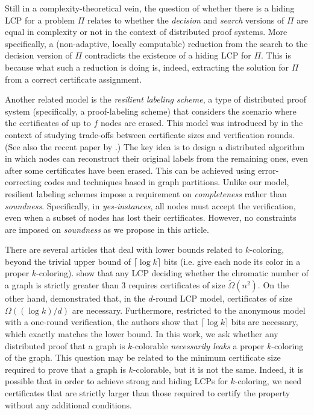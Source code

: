 \documentclass[11pt]{article}
\begin{document}
Still in a complexity-theoretical vein, the question of whether there is a
hiding LCP for a problem $\Pi$ relates to whether the \emph{decision} and
\emph{search} versions of $\Pi$ are equal in complexity or not in the context of
distributed proof systems.
More specifically, a (non-adaptive, locally computable) reduction from the
search to the decision version of $\Pi$ contradicts the existence of a hiding
LCP for $\Pi$.
This is because what such a reduction is doing is, indeed, extracting the
solution for $\Pi$ from a correct certificate assignment.



Another related model is the \emph{resilient labeling scheme}, a type of
distributed proof system (specifically, a proof-labeling scheme) that considers
the scenario where the certificates of up to \( f \) nodes are erased. This
model was introduced by \textcite{fischer2022explicit} in the context of
studying trade-offs between certificate sizes and verification rounds. 
(See also the recent paper by \textcite{censor2025near}.) 
The key idea is to design a distributed algorithm in which nodes can reconstruct
their original labels from the remaining ones, even after some certificates have
been erased. 
This can be achieved using error-correcting codes and  techniques based in graph
partitions.
Unlike our model, resilient labeling schemes impose a requirement on
\emph{completeness} rather than \emph{soundness}. Specifically, in
\emph{yes-instances}, all nodes must accept the verification, even when a subset
of nodes has lost their certificates. However, no constraints are imposed on 
\emph{soundness} as we propose in this article. 

There are several articles that deal with lower bounds related to $k$-coloring, beyond the trivial upper bound of $\lceil \log k \rceil$ bits (i.e. give each node its color in a proper $k$-coloring). \Textcite{goos2016locally} show that any LCP deciding whether the chromatic number of a graph is strictly greater than $3$ requires certificates of size $\tilde{\Omega}(n^2)$. On the other hand, \textcite{bousquet24_local_stacs} demonstrated that, in the $d$-round LCP model, certificates of size $\Omega((\log k)/d)$ are necessary. Furthermore,  restricted to the anonymous model with a one-round verification, the authors show that $\lceil \log k \rceil$ bits are necessary, which exactly matches the lower bound. 
In this work, we ask whether any distributed proof that a graph is $k$-colorable \emph{necessarily leaks} a proper $k$-coloring of the graph. This question may be related to the minimum certificate size required to prove that a graph is $k$-colorable, but it is not the same. Indeed, it is possible that in order to achieve strong and hiding LCPs for $k$-coloring, we need certificates that are strictly larger than those required to certify the property without any additional conditions.
\end{document}
